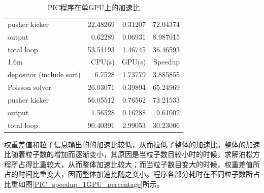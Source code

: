 \begin{table}
\begin{tabular}{|l|r|r|r|}
    pusher kicker            &    22.48269	  &     0.31207	  &  72.04374   \\
    output                   &    0.62289     &     0.06931   &  8.987015   \\
    total loop               &    53.51193    &     1.46745   &  36.46593   \\
    \hline
    1.6m                     &    CPU(s)      &     GPU(s)    &  Speedup    \\
    \hline
    depositor (include sort) &    6.7528      &     1.73779   &  3.885855   \\
    Poisson solver           &    26.03071    &     0.39894   &  65.24969   \\
    pusher kicker            &    56.05512	  &     0.76562	  &  73.21533   \\
    output                   &    1.56528     &     0.16288   &  9.61002    \\
    total loop               &    90.40391    &     2.99053   &  30.23006   \\
    \hline
  \end{tabular}
  \caption{PIC程序在单GPU上的加速比}
  \label{tab:PIC_speedup_1GPU}
\end{table}

权重差值和粒子信息输出的的加速比较低，从而拉低了整体的加速比。整体的加速比随着粒子数的增加而逐渐变小，其原因是当粒子数目较小时的时候，求解泊松方程所占得比重较大，从而整体加速比较大；而当粒子数目变大的时候，权重差值所占的时间比重变大，因而整体加速比随之变小。程序各部分耗时在不同粒子数所占比重如图\ref{PIC_speedup_1GPU_percentage}所示。

